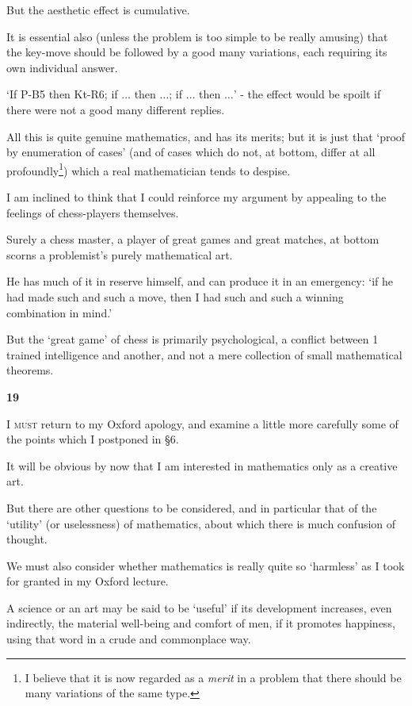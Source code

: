 \documentclass{article}
\numberwithin{equation}{section}
\begin{document}
But the aesthetic effect is cumulative.

It is essential also (unless the problem is too simple to be really amusing) that the key-move should be followed by a good many variations, each requiring its own individual answer.

`If P-B5 then Kt-R6; if $\ldots$ then $\ldots$; if $\ldots$ then $\ldots$' - the effect would be spoilt if there were not a good many different replies.

All this is quite genuine mathematics, and has its merits; but it is just that `proof by enumeration of cases' (and of cases which do not, at bottom, differ at all profoundly\footnote{I believe that it is now regarded as a \textit{merit} in a problem that there should be many variations of the same type.}) which a real mathematician tends to despise.

%
I am inclined to think that I could reinforce my argument by appealing to the feelings of chess-players themselves.

Surely a chess master, a player of great games and great matches, at bottom scorns a problemist's purely mathematical art.

He has much of it in reserve himself, and can produce it in an emergency: `if he had made such and such a move, then I had such and such a winning combination in mind.'

But the `great game' of chess is primarily psychological, a conflict between 1 trained intelligence and another, and not a mere collection of small mathematical theorems.

\begin{center}
    \large\textbf{19}
\end{center}
\textsc{I must} return to my Oxford apology, and examine a little more carefully some of the points which I postponed in \S6.

It will be obvious by now that I am interested in mathematics only as a creative art.

But there are other questions to be considered, and in particular that of the `utility' (or uselessness) of mathematics, about which there is much confusion of thought.

We must also consider whether mathematics is really quite so `harmless' as I took for granted in my Oxford lecture.

%
A science or an art may be said to be `useful' if its development increases, even indirectly, the material well-being and comfort of men, if it promotes happiness, using that word in a crude and commonplace way.
\end{document}
